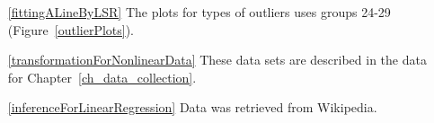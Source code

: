 \begin{itemize}
\item[\ref{fittingALineByLSR}]
    The plots for types of outliers uses groups 24-29
    (Figure~\ref{outlierPlots}).

\item[\ref{transformationForNonlinearData}]
    These data sets are described in
    the data for Chapter~\ref{ch_data_collection}.

\item[\ref{inferenceForLinearRegression}]
    Data was retrieved from Wikipedia.

\end{itemize}




